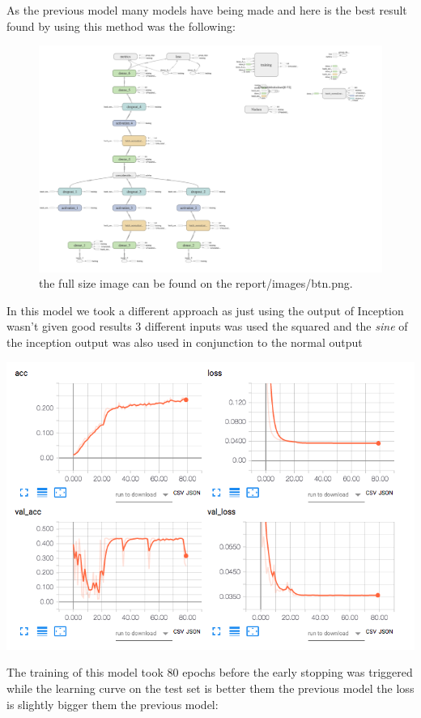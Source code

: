 \documentclass[11pt]{article}
\begin{document}
As the previous model many models have being made and here is the best result 
found by using this method was the following:

\begin{figure}[htbp]
\centering
\includegraphics[width=.9\linewidth]{./images/btn.png}
\caption{the full size image can be found on the report/images/btn.png.}
\end{figure}

In this model we took a different approach as just using the output of
Inception wasn't given good results 3 different inputs was used the squared
and the \emph{sine} of the inception output was also used in conjunction to the
normal output 

\begin{center}
\includegraphics[width=.9\linewidth]{./images/btnLoss.png}
\end{center} 

The training of this model took 80 epochs before the early stopping was
triggered while the learning curve on the test set is better them the previous
model the loss is slightly bigger them the previous model:
\end{document}

